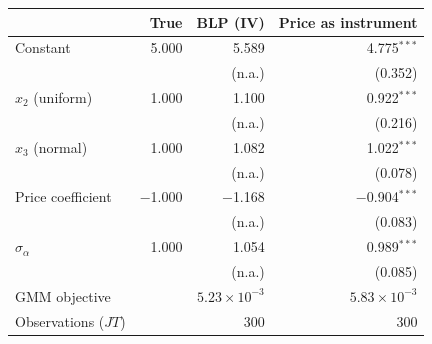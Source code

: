 \begin{tabular}{lrrr}
\toprule
 & True & BLP (IV) & Price as instrument \\
\midrule
Constant & 5.000 & 5.589 & 4.775$^{***}$ \\
 &  & (n.a.) & (0.352) \\
$x_2$ (uniform) & 1.000 & 1.100 & 0.922$^{***}$ \\
 &  & (n.a.) & (0.216) \\
$x_3$ (normal) & 1.000 & 1.082 & 1.022$^{***}$ \\
 &  & (n.a.) & (0.078) \\
Price coefficient & $-$1.000 & $-$1.168 & $-$0.904$^{***}$ \\
 &  & (n.a.) & (0.083) \\
$\sigma_\alpha$ & 1.000 & 1.054 & 0.989$^{***}$ \\
 &  & (n.a.) & (0.085) \\
\midrule
GMM objective &  & $5.23\times10^{-3}$ & $5.83\times10^{-3}$ \\
Observations ($JT$) &  & 300 & 300 \\
\bottomrule
\end{tabular}

